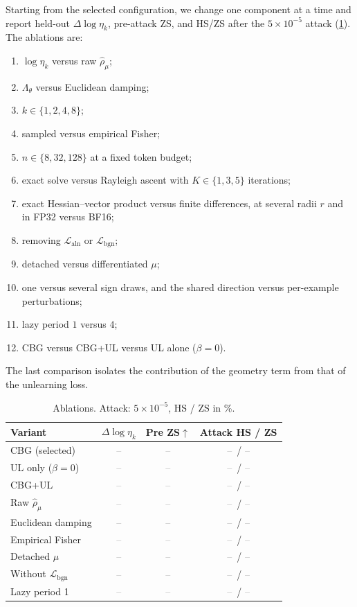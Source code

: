 \documentclass[11pt]{article}
\newcommand{\Laln}{\mathcal{L}_{\mathrm{aln}}}
\newcommand{\Lbgn}{\mathcal{L}_{\mathrm{bgn}}}
\newcommand{\rhohat}{\widehat{\rho}_{\mu}}
\newcommand{\Lam}{\Lambda_{\theta}}
\newcommand{\etak}{\eta_{k}}
\newcommand{\tbd}{\textcolor{gray}{--}}
\begin{document}
Starting from the selected configuration, we change one component at a time and report held-out $\Delta\log\etak$, pre-attack ZS, and HS/ZS after the $5\times10^{-5}$ attack (\cref{tab:ablation}). The ablations are:
\begin{enumerate}
  \item $\log\etak$ versus raw $\rhohat$;
  \item $\Lam$ versus Euclidean damping;
  \item $k\in\{1,2,4,8\}$;
  \item sampled versus empirical Fisher;
  \item $n\in\{8,32,128\}$ at a fixed token budget;
  \item exact solve versus Rayleigh ascent with $K\in\{1,3,5\}$ iterations;
  \item exact Hessian--vector product versus finite differences, at several radii $r$ and in FP32 versus BF16;
  \item removing $\Laln$ or $\Lbgn$;
  \item detached versus differentiated $\mu$;
  \item one versus several sign draws, and the shared direction versus per-example perturbations;
  \item lazy period $1$ versus $4$;
  \item CBG versus CBG+UL versus UL alone ($\beta=0$).
\end{enumerate}
The last comparison isolates the contribution of the geometry term from that of the unlearning loss.

\begin{table}[t]
\centering
\small
\caption{Ablations. Attack: $5\times10^{-5}$, HS / ZS in \%.}
\label{tab:ablation}
\begin{tabular}{lccc}
\toprule
Variant & $\Delta\log\etak$ & Pre ZS$\uparrow$ & Attack HS / ZS\\
\midrule
CBG (selected)              & \tbd & \tbd & \tbd\ / \tbd\\
UL only ($\beta=0$)         & \tbd & \tbd & \tbd\ / \tbd\\
CBG+UL                      & \tbd & \tbd & \tbd\ / \tbd\\
Raw $\rhohat$               & \tbd & \tbd & \tbd\ / \tbd\\
Euclidean damping           & \tbd & \tbd & \tbd\ / \tbd\\
Empirical Fisher            & \tbd & \tbd & \tbd\ / \tbd\\
Detached $\mu$              & \tbd & \tbd & \tbd\ / \tbd\\
Without $\Lbgn$             & \tbd & \tbd & \tbd\ / \tbd\\
Lazy period 1               & \tbd & \tbd & \tbd\ / \tbd\\
\bottomrule
\end{tabular}
\end{table}
\end{document}
